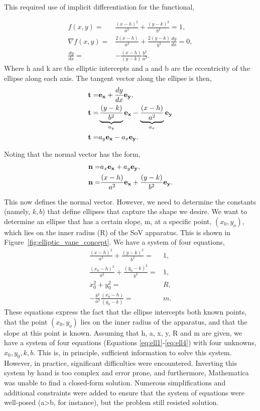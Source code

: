 This required use of implicit differentiation for the functional,

\begin{eqnarray}
 f(x,y)  =& \frac{(x-h)^2}{a^2} + \frac{(y-k)^2}{b^2} = 1, \\
 \nabla f(x,y) =& \frac{2 (x-h)}{a^2} + \frac{2 (y-k)}{b^2}\frac{dy}{dx} = 0, \\
 \frac{dy}{dx} =& -\frac{(x-h)}{(y-k)}\frac{b^2}{a^2}. 
\end{eqnarray}
Where h and k are the elliptic intercepts and a and b are the
eccentricity of the ellipse along each axis. The tangent vector along
the ellipse is then,  
\begin{eqnarray}
 {\bf t} =& {\bf e_x} + \frac{dy}{dx}{\bf e_y}, \\
 {\bf t} =& \underbrace{\frac{(y-k)}{b^2}}_{a_y} {\bf e_x} -
  \underbrace{\frac{(x-h)}{a^2}}_{a_x}{\bf e_y} \\
 {\bf t} =& {a_y} {\bf e_x} - {a_x}{\bf e_y}. 
\end{eqnarray}

Noting that the normal vector has the form, 
\begin{eqnarray}
 {\bf n} =& {a_x} {\bf e_x} + {a_y}{\bf e_y}, \label{eqn:a_x}\\
 {\bf n} =& \frac{(x-h)}{a^2} {\bf e_x} + \frac{(y-k)}{b^2} {\bf e_y}.
\end{eqnarray}

This now defines the normal vector. However, we need to determine the 
constants (namely, $k,b$) that define ellipses that capture the shape we
desire. We want to determine an ellipse that has a certain
slope, m, at a specific point,  $(x_0,y_o)$, which lies on the inner
radius (R) of the SoV apparatus. This is shown in
Figure~\ref{fig:elliptic_vane_concept}. We have a system of four
equations,
\begin{eqnarray}
 \frac{(x-h)^2}{a^2} + \frac{(y-k)^2}{b^2} =& 1, \label{eq:ell1}\\
 \frac{(x_0-h)^2}{a^2} + \frac{(y_0-k)^2}{b^2} =& 1, \label{eq:ell2}  \\
 x_0^2 + y_0^2 =& R, \label{eq:ell3} \\
 -\frac{b^2}{a^2}\frac{(x_0-h)}{(y_0-k)} =& m. \label{eq:ell4} 
\end{eqnarray}
These equations express the fact that the ellipse intercepts both known
points, that the point $(x_0,y_o)$ lies on the inner radius of the
apparatus, and that the slope at this point is known. Assuming that
h, a, x, y, R and m are given, we have a system of four equations
(Equations \ref{eq:ell1}-\ref{eq:ell4}) with four unknowns,
$x_0,y_0,k,b$. This is, in principle, sufficient information to solve
this system. However, in practice, significant difficulties were
encountered. Inverting this system by hand is too complex and error
prone, and furthermore, Mathematica was unable to find a closed-form
solution. Numerous simplifications and additional constraints were added
to ensure that the system of equations were well-posed (a>b, for
instance), but the problem still resisted solution. 

